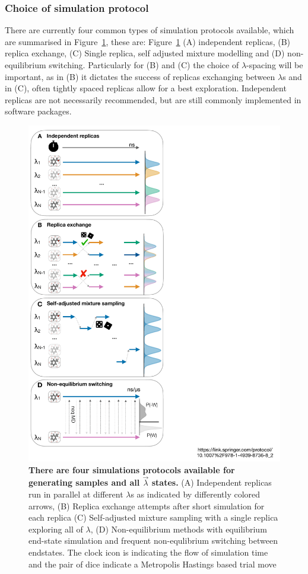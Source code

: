 \documentclass[9pt,bestpractices]{livecoms}
\begin{document}
\subsubsection{Choice of simulation protocol}
There are currently four common types of simulation protocols available, which are summarised in Figure~\ref{fig:protocols}, these are: Figure~\ref{fig:protocols} (A) independent replicas, (B) replica exchange, (C) Single replica, self adjusted mixture modelling and (D) non-equilibrium switching. Particularly for (B) and (C) the choice of $\lambda$-spacing will be important, as in (B) it dictates the success of replicas exchanging between $\lambda$s and in (C), often tightly spaced replicas allow for a best exploration. Independent replicas are not necessarily recommended, but are still commonly implemented in software packages. 
\begin{figure}
    \includegraphics[width=0.95\linewidth]{figures/setup/protocol/Figure.pdf}
    \caption{\textbf{There are four simulations protocols available for generating samples and all $\vec{\lambda}$ states.} (A) Independent replicas run in parallel at different $\lambda$s as indicated by differently colored arrows, (B) Replica exchange attempts after short simulation for each replica (C) Self-adjusted mixture sampling with a single replica exploring all of $\lambda$, (D) Non-equilibrium methods with equilibrium end-state simulation and frequent non-equlibrium switching between endstates. The clock icon is indicating the flow of simulation time and the pair of dice indicate a Metropolis Hastings based trial move}
    \label{fig:protocols}
\end{figure}
\end{document}
